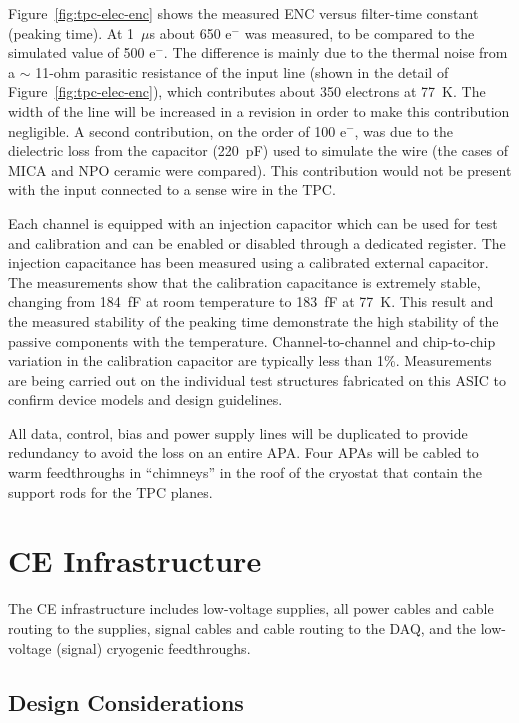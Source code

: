 Figure~\ref{fig:tpc-elec-enc} shows the measured ENC versus filter-time constant (peaking time).
At 1~$\mu$s about 650 e$^{-}$ was measured,
to be compared to the simulated value of 500 e$^{-}$. The difference is
mainly due to the thermal noise from a $\sim$
11-ohm parasitic resistance of the input
line (shown in the detail of Figure~\ref{fig:tpc-elec-enc}), which contributes about 350
electrons at 77~K. The width of the line will be increased in a
revision in order to make this contribution negligible. A second
contribution, on the order of 100 e$^{-}$, was due to the dielectric
loss from the  capacitor (220~pF) used to simulate the wire (the cases of MICA and NPO ceramic were compared). This contribution would not be
present with the input connected to a sense wire in the TPC.

Each channel is equipped with an injection capacitor which can be used
for test and calibration and can be enabled or disabled through a
dedicated register. The injection capacitance has been measured using 
a calibrated external capacitor. The measurements show
that the calibration capacitance is extremely stable, changing from
184~fF at room temperature to 183~fF at 77~K. This result and the measured
stability of the peaking time demonstrate the high stability of the
passive components with the temperature. Channel-to-channel and chip-to-chip
variation in the calibration capacitor are typically less than 1\%. Measurements are being carried
out on the individual test structures fabricated on this ASIC to
confirm device models and design guidelines.

All data, control, bias and power supply lines will be duplicated to
provide redundancy to avoid the loss on an entire APA.  Four APAs will be
cabled to warm feedthroughs in ``chimneys'' in the roof of the cryostat that
contain the support rods for the TPC planes.

\section{CE Infrastructure}
\label{sec:ce-feedthru}
   
The CE infrastructure includes low-voltage supplies, all power cables and cable routing to the supplies,
signal cables and cable routing to the DAQ, and the low-voltage (signal) cryogenic feedthroughs.

\subsection{Design Considerations} 
\label{subsec:ce-feedthru-reqs-n-specs}

